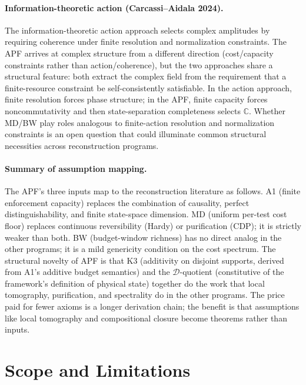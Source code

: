 \documentclass[11pt,a4paper]{article}
\theoremstyle{definition}
\begin{document}
\paragraph{Information-theoretic action (Carcassi--Aidala 2024).}
The information-theoretic action approach selects complex amplitudes by requiring coherence under finite resolution and normalization constraints.  The APF arrives at complex structure from a different direction (cost/capacity constraints rather than action/coherence), but the two approaches share a structural feature: both extract the complex field from the requirement that a finite-resource constraint be self-consistently satisfiable.  In the action approach, finite resolution forces phase structure; in the APF, finite capacity forces noncommutativity and then state-separation completeness selects $\mathbb{C}$.  Whether MD/BW play roles analogous to finite-action resolution and normalization constraints is an open question that could illuminate common structural necessities across reconstruction programs.

\paragraph{Summary of assumption mapping.}
The APF's three inputs map to the reconstruction literature as follows.  A1 (finite enforcement capacity) replaces the combination of causality, perfect distinguishability, and finite state-space dimension.  MD (uniform per-test cost floor) replaces continuous reversibility (Hardy) or purification (CDP); it is strictly weaker than both.  BW (budget-window richness) has no direct analog in the other programs; it is a mild genericity condition on the cost spectrum.  The structural novelty of APF is that K3 (additivity on disjoint supports, derived from A1's additive budget semantics) and the $\mathcal{D}$-quotient (constitutive of the framework's definition of physical state) together do the work that local tomography, purification, and spectrality do in the other programs.  The price paid for fewer axioms is a longer derivation chain; the benefit is that assumptions like local tomography and compositional closure become theorems rather than inputs.

\section{Scope and Limitations}
\label{sec:scope}
\end{document}
